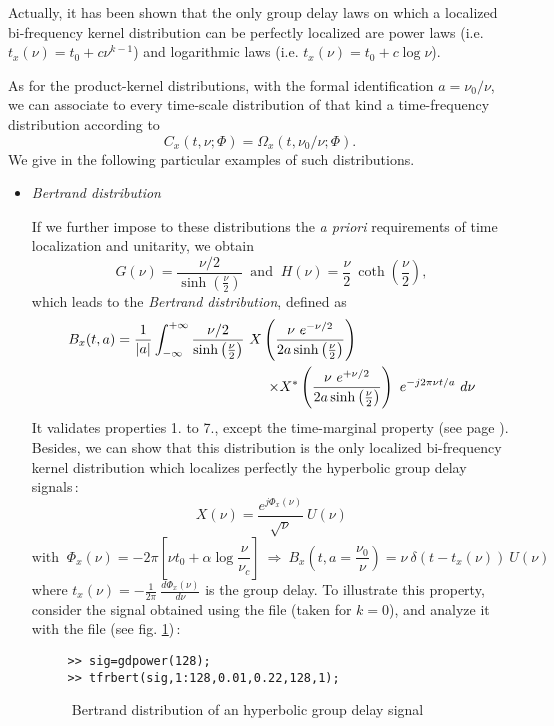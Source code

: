  Actually, it has been shown that the only group delay laws on which a
localized bi-frequency kernel distribution can be perfectly localized are
power laws (i.e. $t_x(\nu)=t_0+c\nu^{k-1}$) and logarithmic laws
(i.e. $t_x(\nu)=t_0+c \log{\nu}$).

  As for the product-kernel distributions, with the formal identification
$a=\nu_0/\nu$, we can associate to every time-scale distribution of that kind a
time-frequency distribution according to
\[C_x(t,\nu;\Phi)=\Omega_x(t,\nu_0/\nu;\Phi).\]
We give in the following particular examples of such distributions. 

\begin{itemize}
\item {\it Bertrand distribution}
\label{bertdist1}

  If we further impose to these distributions the {\it a priori} requirements of
time localization and unitarity, we obtain
\[G(\nu)=\frac{\nu/2}{\sinh\left(\frac{\nu}{2}\right)}\ \mbox{  and  }\
H(\nu)=\frac{\nu}{2}\ \coth\left(\frac{\nu}{2}\right),\] 
which leads to the {\it Bertrand distribution}, defined as 
\begin{eqnarray}
\label{bertrand}
B_x(t,a)=\frac{1}{|a|}\int_{-\infty}^{+\infty}
\frac{\nu/2}{\sinh\left(\frac{\nu}{2}\right)}\  
  X\left(\frac{\nu\ e^{-\nu/2}}{2a
\sinh\left(\frac{\nu}{2}\right)}\right)\hspace*{3cm}\nonumber\\ 
\hspace*{1cm}\times X^*\left(\frac{\nu\ e^{+\nu/2}}{2a
\sinh\left(\frac{\nu}{2}\right)}\right)\ e^{-j2\pi\nu t/a}\ d\nu	
\end{eqnarray}
It validates properties 1. to 7., except the time-marginal property (see
page \pageref{propertiesaff}). Besides, we can show that this distribution
is the only localized bi-frequency kernel distribution which localizes
perfectly the hyperbolic group delay signals\,:
\[X(\nu)=\frac{e^{j\Phi_x(\nu)}}{\sqrt{\nu}}\ U(\nu)\] 
\[\mbox{with }\ \Phi_x(\nu)=-2\pi\left[\nu t_0+\alpha
\log\frac{\nu}{\nu_c}\right]\ \Rightarrow\ B_x(t,a=\frac{\nu_0}{\nu})=\nu\
\delta(t-t_x(\nu))\ U(\nu) \] where $t_x(\nu)=-\frac{1}{2\pi}\
\frac{d\Phi_x(\nu)}{d\nu}$ is the group delay. To illustrate this property,
consider the signal obtained using the file \index{\ttfamily
gdpower}{\ttfamily gdpower.m} (taken for $k=0$), and analyze it with the
file \index{\ttfamily tfrbert}{\ttfamily tfrbert.m} (see
fig. \ref{En2fig4})\,:
\begin{verbatim}
     >> sig=gdpower(128);
     >> tfrbert(sig,1:128,0.01,0.22,128,1);
\end{verbatim}
\begin{figure}[htb]
\epsfxsize=10cm
\epsfysize=8cm
\centerline{}
\caption{\label{En2fig4}Bertrand distribution of an hyperbolic group delay
signal}
\end{figure}


\end{itemize}
